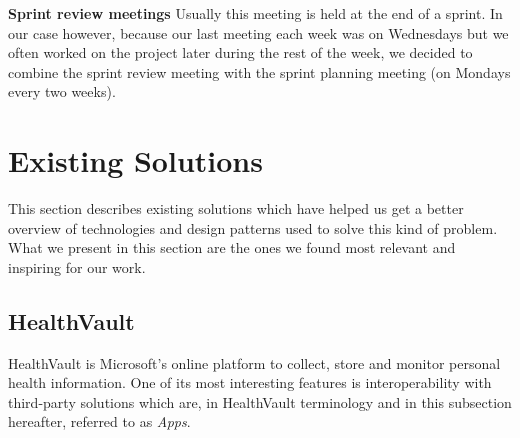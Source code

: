 \textbf{Sprint review meetings}\newline
Usually this meeting is held at the end of a sprint. 
In our case however, because our last meeting each week was on Wednesdays but we often worked on the project later during the rest of the week, we decided to combine the sprint review meeting with the sprint planning meeting (on Mondays every two weeks).




\section{Existing Solutions}
\label{section:existing-solutions}

This section describes existing solutions which have helped us get a better overview of technologies and design patterns used to solve this kind of problem. 
What we present in this section are the ones we found most relevant and inspiring for our work.


\subsection{HealthVault}

HealthVault is Microsoft's online platform to collect, store and monitor personal health information. %
One of its most interesting features is interoperability with third-party solutions which are, in HealthVault terminology and in this subsection hereafter, referred to as \textit{Apps}.

